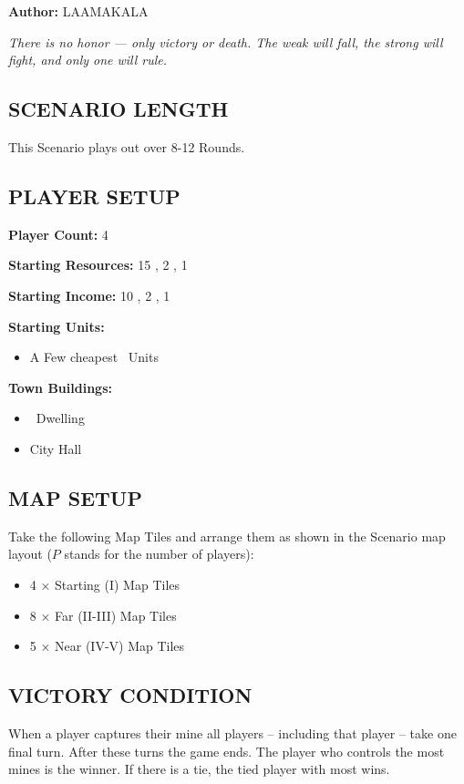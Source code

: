 
\begin{multicols*}{2}

\textbf{Author:} LAAMAKALA

\textit{There is no honor — only victory or death. The weak will fall, the strong will fight, and only one will rule.}

\subsection*{\MakeUppercase{Scenario Length}}
This Scenario plays out over 8-12 Rounds.

\subsection*{\MakeUppercase{Player Setup}}
\textbf{Player Count:} 4

\textbf{Starting Resources:} 15 , 2 , 1 

\textbf{Starting Income:} 10 , 2 , 1 

\textbf{Starting Units:}
\begin{itemize}
  \item A Few cheapest \silver\ Units
\end{itemize}

\textbf{Town Buildings:}
\begin{itemize}
  \item \bronze\ Dwelling
  \item City Hall
\end{itemize}

\subsection*{\MakeUppercase{Map Setup}}
Take the following Map Tiles and arrange them as shown in the Scenario map layout ($P$ stands for the number of players):

\begin{itemize}
  \item 4 × Starting (I) Map Tiles
  \item 8 × Far (II-III) Map Tiles
  \item 5 × Near (IV-V) Map Tiles
\end{itemize}

\subsection*{\MakeUppercase{Victory Condition}}
When a player captures their  mine all players -- including that player -- take one final turn. After these turns the game ends. The player who controls the most mines is the winner. If there is a tie, the tied player with most  wins.


\end{multicols*}
